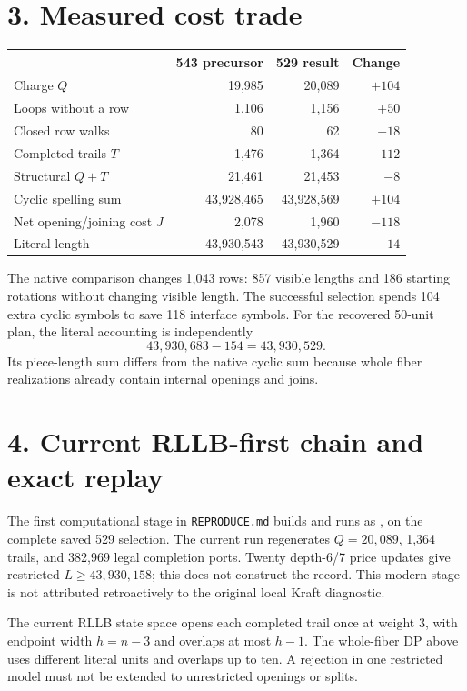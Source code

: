 \documentclass[11pt]{article}
\begin{document}
\section*{3. Measured cost trade}
\begin{center}\small
\begin{tabular}{lrrr}\toprule
 &543 precursor&529 result&Change\\\midrule
Charge $Q$&19,985&20,089&$+104$\\
Loops without a row&1,106&1,156&$+50$\\
Closed row walks&80&62&$-18$\\
Completed trails $T$&1,476&1,364&$-112$\\
Structural $Q+T$&21,461&21,453&$-8$\\
Cyclic spelling sum&43,928,465&43,928,569&$+104$\\
Net opening/joining cost $J$&2,078&1,960&$-118$\\\midrule
Literal length&43,930,543&43,930,529&$-14$\\\bottomrule
\end{tabular}\end{center}
The native comparison changes 1,043 rows: 857 visible lengths and 186
starting rotations without changing visible length. The successful
selection spends 104 extra cyclic symbols to save 118 interface symbols.
For the recovered 50-unit plan, the literal accounting is independently
\[
\boxed{43{,}930{,}683-154=43{,}930{,}529.}
\]
Its piece-length sum differs from the native cyclic sum because whole
fiber realizations already contain internal openings and joins.

\section*{4. Current RLLB-first chain and exact replay}
The first computational stage in \texttt{REPRODUCE.md} builds and runs
 as , on the complete saved 529
selection. The current run regenerates $Q=20{,}089$, 1,364 trails,
and 382,969 legal completion ports. Twenty depth-6/7 price updates give
restricted $L\geq43{,}930{,}158$; this does not construct the record.
This modern stage is not attributed retroactively to the original local
Kraft diagnostic.

The current RLLB state space opens each completed trail once at weight 3,
with endpoint width $h=n-3$ and overlaps at most $h-1$. The whole-fiber DP
above uses different literal units and overlaps up to ten. A rejection in
one restricted model must not be extended to unrestricted openings or splits.
\end{document}
